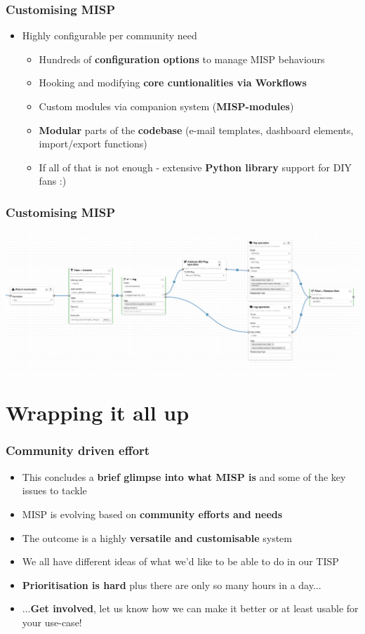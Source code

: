 \begin{frame}
\frametitle{Customising MISP}
    \begin{itemize}
        \item Highly configurable per community need
             \begin{itemize}
                 \item Hundreds of {\bf configuration options} to manage MISP behaviours
                 \item Hooking and modifying {\bf core cuntionalities via Workflows}
                 \item Custom modules via companion system ({\bf MISP-modules})
                 \item {\bf Modular} parts of the {\bf codebase} (e-mail templates, dashboard elements, import/export functions)
                 \item If all of that is not enough - extensive {\bf Python library} support for DIY fans :)
             \end{itemize}
    \end{itemize}
\end{frame}

\begin{frame}
    \frametitle{Customising MISP}
    \includegraphics[width=1.00\linewidth]{blueprint.png}
\end{frame}


\section{Wrapping it all up}

\begin{frame}
\frametitle{Community driven effort}
    \begin{itemize}
        \item This concludes a {\bf brief glimpse into what MISP is} and some of the key issues to tackle
        \item MISP is evolving based on {\bf community efforts and needs}
        \item The outcome is a highly {\bf versatile and customisable} system
        \item We all have different ideas of what we'd like to be able to do in our TISP
        \item {\bf Prioritisation is hard} plus there are only so many hours in a day...
        \item ...{\bf Get involved}, let us know how we can make it better or at least usable for your use-case!
    \end{itemize}
\end{frame}


